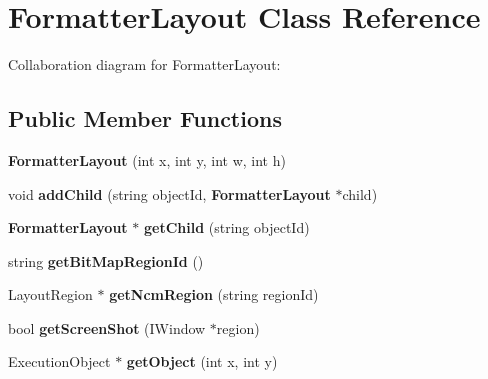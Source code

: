 \section{FormatterLayout Class Reference}
\label{classbr_1_1pucrio_1_1telemidia_1_1ginga_1_1ncl_1_1model_1_1presentation_1_1FormatterLayout}
Collaboration diagram for FormatterLayout:\subsection*{Public Member Functions}
\begin{CompactItemize}
\item 
\textbf{FormatterLayout} (int x, int y, int w, int h)\label{classbr_1_1pucrio_1_1telemidia_1_1ginga_1_1ncl_1_1model_1_1presentation_1_1FormatterLayout_42de6972aad0eb477e7b62b80b4ecc59}

\item 
void \textbf{addChild} (string objectId, {\bf FormatterLayout} $\ast$child)\label{classbr_1_1pucrio_1_1telemidia_1_1ginga_1_1ncl_1_1model_1_1presentation_1_1FormatterLayout_9980fb2c81f4df15e0363d7a7210120e}

\item 
{\bf FormatterLayout} $\ast$ \textbf{getChild} (string objectId)\label{classbr_1_1pucrio_1_1telemidia_1_1ginga_1_1ncl_1_1model_1_1presentation_1_1FormatterLayout_7f9f7f7b9b50bc3d40de64c1c8681997}

\item 
string \textbf{getBitMapRegionId} ()\label{classbr_1_1pucrio_1_1telemidia_1_1ginga_1_1ncl_1_1model_1_1presentation_1_1FormatterLayout_f401516681be58a7b50a5896693420c8}

\item 
LayoutRegion $\ast$ \textbf{getNcmRegion} (string regionId)\label{classbr_1_1pucrio_1_1telemidia_1_1ginga_1_1ncl_1_1model_1_1presentation_1_1FormatterLayout_8968a173417b5de80ced45faa7ed8935}

\item 
bool \textbf{getScreenShot} (IWindow $\ast$region)\label{classbr_1_1pucrio_1_1telemidia_1_1ginga_1_1ncl_1_1model_1_1presentation_1_1FormatterLayout_a858bab2fb732dced89945296782ff5a}

\item 
ExecutionObject $\ast$ \textbf{getObject} (int x, int y)\label{classbr_1_1pucrio_1_1telemidia_1_1ginga_1_1ncl_1_1model_1_1presentation_1_1FormatterLayout_4a7cb0f99f58ab5d60b014e5c99cb547}


\end{CompactItemize}
